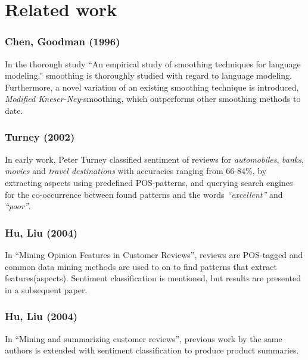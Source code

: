 \documentclass[a4paper,11pt]{kth-mag}
\begin{document}


\newpage
\section{Related work}

\subsubsection{Chen, Goodman (1996)}
In the thorough study ``An empirical study of smoothing techniques for language modeling.'' smoothing is
thoroughly studied with regard to language modeling. Furthermore, a novel variation of an existing
smoothing technique is introduced, \emph{Modified Kneser-Ney}-smoothing, which outperforms other
smoothing methods to date.


\subsubsection{Turney (2002)}
In early work, Peter Turney classified sentiment of reviews for \emph{automobiles}, \emph{banks}, \emph{movies} and \emph{travel destinations} with accuracies ranging from 66-84\%, by extracting aspects using predefined POS-patterns, and querying search engines for the co-occurrence between found patterns and the words \emph{``excellent''} and \emph{``poor''}\cite{turney2002thumbs}.

\subsubsection{Hu, Liu (2004)}
In ``Mining Opinion Features in Customer Reviews'', reviews are POS-tagged and common data mining methods are used to on to find patterns that extract features(aspects). Sentiment classification is mentioned, but results are presented in a subsequent paper.

\subsubsection{Hu, Liu (2004)}
In ``Mining and summarizing customer reviews'',
previous work by the same authors is extended
with sentiment classification to produce product summaries.
\end{document}
